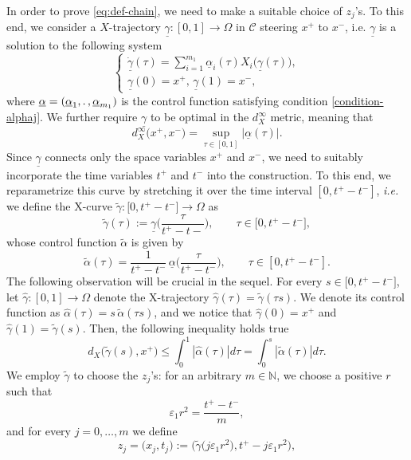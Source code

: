\documentclass[11pt,a4paper]{article}
\numberwithin{equation}{section}
\newcommand{\N}{\mathbb{N}}
\def \tt {\tilde}
\def \a {{\alpha}}
\def \e {{\varepsilon}}
\def \t {{\tau}}
\def \O {{\Omega}}
\begin{document}
{{In order to prove \eqref{eq:def-chain}, we need to make a suitable choice of $z_j$'s. To this end, we consider a $X$-trajectory $\underline{\gamma}:[0,1] \rightarrow \Omega$ in $\mathcal{C}$ steering $x^+$ to $x^-$, i.e. $\underline{\gamma}$ is a solution to the following system 
\begin{equation}
	\begin{cases}
		\displaystyle\dot{\underline{\gamma}}(\t)=\sum_{i=1}^{m_1}\underline\alpha_i(\t)X_i\Big(\underline{\gamma}(\t)\Big), \\
		\underline{\gamma}(0)=x^+, \, \underline{\gamma}(1)=x^-,
	\end{cases}
\end{equation}
where $\underline\alpha=(\underline{\a}_1,\ldotp,\underline{\a}_{m_1})$ is the control function satisfying condition \eqref{condition-alphaj}. We further require $\underline{\gamma}$ to be optimal in the $d^\infty_X$ metric, meaning that
\begin{equation}\label{gamma-opt}
	d^\infty_X\big(x^+,x^-\big) = \sup_{\t\in [0,1]} |\underline\a(\t) |.
\end{equation}
Since $\underline{\gamma}$ connects only the space variables $x^+$ and $x^-$, we need to suitably incorporate the time variables $t^+$ and $t^-$ into the construction. To this end, we reparametrize this curve by stretching it over the time interval $[0,t^+-t^-]$, \emph{i.e.} we define the X-curve $\tt\gamma : \big[0,t^+-t^-\big]\to \O$ as 
\begin{equation}
	\tt \gamma(\t) := \underline{\gamma}\Bigg(\frac{\t}{t^+-t-}\Bigg),\qquad \t\in \big[0,t^+-t^-\big],
\end{equation}
whose control function $\tt \a$ is given by 
\begin{equation}\label{riparametrix}
	\tt \a (\t)=\frac{1}{t^+-t^-}\,\underline{\a}\Bigg(\frac{\t}{t^+-t^-}\Bigg),\qquad \t\in [0,t^+-t^-]. 
\end{equation}
The following observation will be crucial in the sequel. For every $s \in \big[0,t^+-t^-\big]$, let $\widehat \gamma:[0,1]\to \O$ denote the X-trajectory $\widehat\gamma(\t)=\tt \gamma (\t s)$. We denote its control function as $\widehat \a (\t)=s\,\tt\a(\t s)$, and we notice that $\widehat \gamma (0)=x^+$ and $\widehat \gamma (1)=\tt\gamma(s)$. Then, the following inequality holds true
\begin{equation}\label{despar}
	d_X\big(\tt\gamma(s),x^+\big)\leq\int_0^1|\widehat \a(\t)|d\t =  \int_0^s|\tt\a(\t)|d\t.
\end{equation}
We employ $\tt \gamma$ to choose the $z_j$'s: for an arbitrary $m\in\N$, we choose a positive $r$ such that
\begin{equation}\label{eq:def-r}
	\varepsilon_1 r^2=\frac{t^+-t^-}{m},
\end{equation}
and for every $j=0,\ldots,m$ we define
\begin{equation*}
	z_j=\big(x_j,t_j\big):=\Big(\tt{\gamma}\big(j\e_1r^2\big),t^+-j\e_1r^2\Big),
\end{equation*}
\begin{figure}\label{figure-harnack-chain}
	\centering
	\begin{tikzpicture}[scale=1, every node/.style={font=\small}]
		

\end{tikzpicture}
\end{figure}}}
\end{document}
